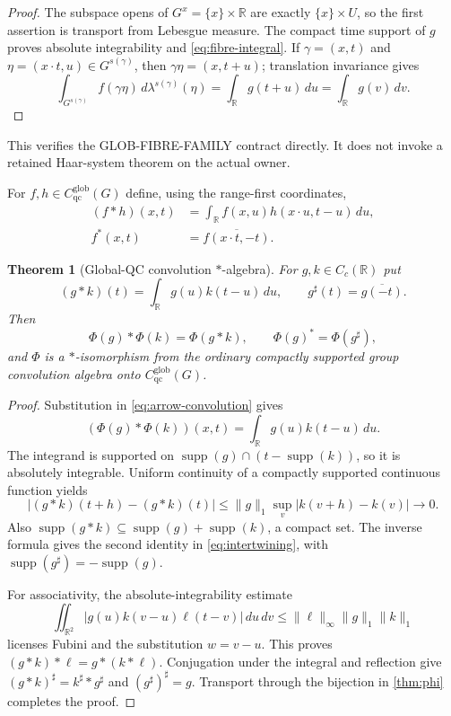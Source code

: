 \documentclass[11pt]{article}
\newtheorem{theorem}{Theorem}[section]
\theoremstyle{definition}
\newcommand{\R}{\mathbb R}
\newcommand{\Cglob}{C_{\mathrm{qc}}^{\mathrm{glob}}}
\newcommand{\supp}{\operatorname{supp}}
\begin{document}
\begin{proof}
The subspace opens of $G^x=\{x\}\times\R$ are exactly
$\{x\}\times U$, so the first assertion is transport from Lebesgue measure.
The compact time support of $g$ proves absolute integrability and
\cref{eq:fibre-integral}.  If $\gamma=(x,t)$ and
$\eta=(x\cdot t,u)\in G^{s(\gamma)}$, then
$\gamma\eta=(x,t+u)$; translation invariance gives
\[
 \int_{G^{s(\gamma)}} f(\gamma\eta)\,d\lambda^{s(\gamma)}(\eta)
 =\int_{\R} g(t+u)\,du
 =\int_{\R} g(v)\,dv.
\]
\end{proof}

This verifies the GLOB-FIBRE-FAMILY contract directly.  It does not invoke a
retained Haar-system theorem on the actual owner.

For $f,h\in\Cglob(G)$ define, using the range-first coordinates,
\begin{align}
 (f*h)(x,t)&=\int_{\R} f(x,u)h(x\cdot u,t-u)\,du,\label{eq:arrow-convolution}\\
 f^*(x,t)&=\overline{f(x\cdot t,-t)}.\label{eq:arrow-involution}
\end{align}

\begin{theorem}[Global-QC convolution $*$-algebra]
\label{thm:star-algebra}
For $g,k\in C_c(\R)$ put
\[
 (g*k)(t)=\int_{\R} g(u)k(t-u)\,du,
 \qquad g^{\sharp}(t)=\overline{g(-t)}.
\]
Then
\begin{equation}
 \Phi(g)*\Phi(k)=\Phi(g*k),\qquad
 \Phi(g)^*=\Phi(g^{\sharp}),
 \label{eq:intertwining}
\end{equation}
and $\Phi$ is a $*$-isomorphism from the ordinary compactly supported group
convolution algebra onto $\Cglob(G)$.
\end{theorem}

\begin{proof}
Substitution in \cref{eq:arrow-convolution} gives
\[
 (\Phi(g)*\Phi(k))(x,t)
 =\int_{\R} g(u)k(t-u)\,du.
\]
The integrand is supported on
$\supp(g)\cap(t-\supp(k))$, so it is absolutely integrable.  Uniform
continuity of a compactly supported continuous function yields
\[
 |(g*k)(t+h)-(g*k)(t)|
 \le \|g\|_1\sup_v|k(v+h)-k(v)|\longrightarrow0.
\]
Also $\supp(g*k)\subseteq\supp(g)+\supp(k)$, a compact set.  The inverse
formula gives the second identity in \cref{eq:intertwining}, with
$\supp(g^{\sharp})=-\supp(g)$.

For associativity, the absolute-integrability estimate
\[
 \iint_{\R^2}|g(u)k(v-u)\ell(t-v)|\,du\,dv
 \le \|\ell\|_{\infty}\|g\|_1\|k\|_1
\]
licenses Fubini and the substitution $w=v-u$.  This proves
$(g*k)*\ell=g*(k*\ell)$.  Conjugation under the integral and reflection
give $(g*k)^{\sharp}=k^{\sharp}*g^{\sharp}$ and
$(g^{\sharp})^{\sharp}=g$.  Transport through the bijection in
\cref{thm:phi} completes the proof.
\end{proof}
\end{document}
